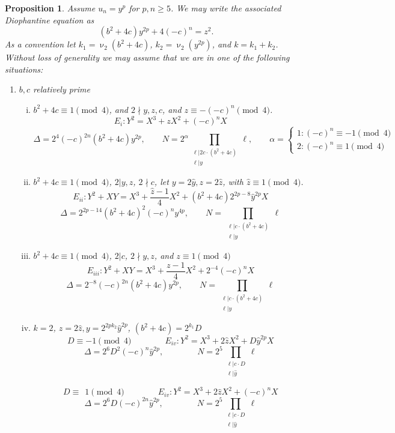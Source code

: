 \documentclass[12pt]{amsart}
\newtheorem{prop}[thm]{Proposition}
\theoremstyle{definition}
\newcommand{\notdiv}{\nmid}
\begin{document}
\begin{prop}\label{freycurves}
Assume $u_n = y^p$ for $p,n \geq 5$.  We may write the associated Diophantine equation as
\[ (b^2+4c)y^{2p} + 4(-c)^n = z^2.\]
As a convention let $k_1 = \upnu_2(b^2+4c)$, $k_2 = \upnu_2(y^{2p})$, and $k = k_1+k_2$.  Without loss of generality we may assume that we are in one of the following situations:

\begin{enumerate}[1.]

\item $b,c$ relatively prime

\begin{enumerate}[(i)]

\item $b^2+4c \equiv 1 \pmod{4}$, and $2 \notdiv y,z,c$, and $z \equiv -(-c)^n \pmod{4}$.
\[ E_i: Y^2 = X^3 + zX^2 + (-c)^nX \]
\[ \Delta = 2^4(-c)^{2n}(b^2+4c)y^{2p},  \qquad N = 2^{\alpha} \prod_{\substack{ \ell | 2c \cdot (b^2+4c) \\ \ell | y}} \ell, \qquad \alpha =  \begin{cases} 1: (-c)^n \equiv -1 \pmod{4}\\ 2 : (-c)^n \equiv 1 \pmod{4} \end{cases} \]
\item $b^2+4c \equiv 1 \pmod{4}$, $2|y,z$, $2 \notdiv c$, let $y = 2\hat{y}, z = 2\hat{z}$, with $\hat{z} \equiv 1 \pmod{4}$.
\[ E_{ii} : Y^2 +XY = X^3 + \frac{\hat{z} - 1}{4} X^2 + (b^2+4c)2^{2p-8}\hat{y}^{2p}X \]
\[ \Delta = 2^{2p-14}(b^2+4c)^2(-c)^ny^{4p}, \qquad N = \prod_{\substack{ \ell | c \cdot (b^2+4c) \\ \ell | y}} \ell  \]
\item $b^2+4c \equiv 1 \pmod{4}$, $2|c$, $2 \notdiv y,z$, and $z \equiv 1 \pmod{4}$
\[ E_{iii}: Y^2 +XY = X^3 +\frac{z-1}{4}X^2 +2^{-4}(-c)^nX \]
\[ \Delta = 2^{-8}(-c)^{2n}(b^2+4c)y^{2p} , \qquad N = \prod_{\substack{ \ell | c \cdot (b^2+4c) \\ \ell | y}} \ell  \]
\item $k = 2$, $z = 2 \hat{z}, y = 2^{2pk_2}\hat{y}^{2p}$, $(b^2+4c) = 2^{k_1}D$
\[D \equiv -1 \pmod{4} \qquad \qquad E_{iv} : Y^2 = X^3 +2\hat{z}X^2 +D\hat{y}^{2p}X \]
\[\Delta = 2^{6}D^2(-c)^n\hat{y}^{2p}, \qquad \qquad N = 2^{5}\prod_{\substack{ \ell | c \cdot D \\ \ell | \hat{y}}} \ell  \]

\[D \equiv \ \ 1 \pmod{4}  \qquad \qquad  E_{iv} : Y^2 = X^3 +2\hat{z}X^2 +(-c)^nX \]
\[\Delta = 2^{6}D(-c)^{2n}\hat{y}^{2p}, \qquad \qquad N = 2^{5}\prod_{\substack{ \ell | c \cdot D \\ \ell | \hat{y}}} \ell  \]


\end{enumerate}
\end{enumerate}
\end{prop}
\end{document}

